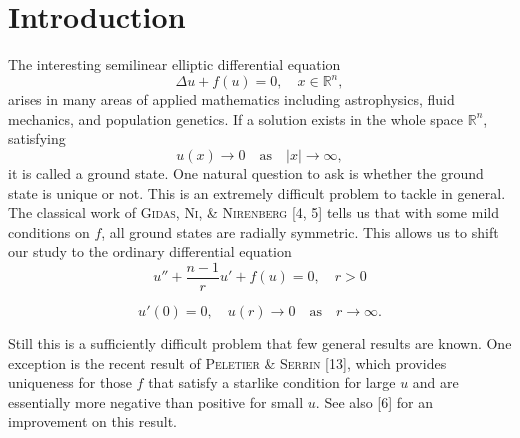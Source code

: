 \section{Introduction}

The interesting semilinear elliptic differential equation
\begin{equation}\label{eq:1.1}
  \Delta u + f(u) = 0, \quad x\in \mathbb{R}^n,
\end{equation}
arises in many areas of applied mathematics including astrophysics,
fluid mechanics, and population genetics.
If a solution exists in the whole space $\mathbb{R}^n$, satisfying
\begin{equation}\label{eq:1.2}
  u(x) \to 0 \quad \text{as} \quad |x| \to \infty,
\end{equation}
it is called a ground state.
One natural question to ask is whether the ground state is unique or not.
This is an extremely difficult problem to tackle in general.
The classical work of \textsc{Gidas}, \textsc{Ni}, \& \textsc{Nirenberg}
[4, 5] tells us that with some mild conditions on $f$, all ground states are
radially symmetric. This allows us to shift our study to the ordinary differential equation
\begin{equation}\label{eq:1.3}
  u'' + \frac{n-1}{r} u' + f(u) = 0,\quad r>0
\end{equation}

\begin{equation}\label{eq:1.4}
  u'(0) = 0,\quad u(r)\to 0\quad \text{as} \quad r\to\infty.
\end{equation}

Still this is a sufficiently difficult problem that few general results are known.
One exception is the recent result of \textsc{Peletier} \& \textsc{Serrin} [13],
which provides uniqueness for those $f$ that satisfy a starlike condition for large $u$
and are essentially more negative than positive for small $u$.
See also [6] for an improvement on this result.

